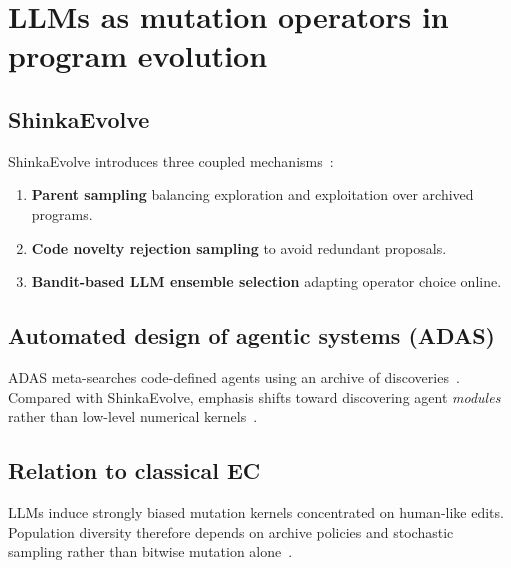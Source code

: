 \section{LLMs as mutation operators in program evolution}
\label{sec:llm}

\subsection{ShinkaEvolve}
ShinkaEvolve introduces three coupled mechanisms~\cite{lange2025shinka}:
\begin{enumerate}
  \item \textbf{Parent sampling} balancing exploration and exploitation over archived programs.
  \item \textbf{Code novelty rejection sampling} to avoid redundant proposals.
  \item \textbf{Bandit-based LLM ensemble selection} adapting operator choice online.
\end{enumerate}

\subsection{Automated design of agentic systems (ADAS)}
ADAS meta-searches code-defined agents using an archive of discoveries~\cite{hu2025adas}.
Compared with ShinkaEvolve, emphasis shifts toward discovering agent \emph{modules} rather than low-level numerical kernels~\cite{romera2024mathematical}.

\subsection{Relation to classical EC}
LLMs induce strongly biased mutation kernels concentrated on human-like edits.
Population diversity therefore depends on archive policies and stochastic sampling rather than bitwise mutation alone~\cite{lange2025shinka}.
